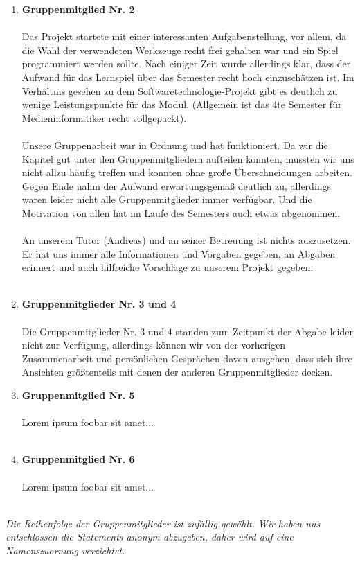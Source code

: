 \documentclass[a4paper]{article}
\begin{document}
\begin{enumerate}
    \item \textbf{Gruppenmitglied Nr. 2}\\
    \\
    Das Projekt startete mit einer interessanten Aufgabenstellung, vor allem, da die Wahl der verwendeten Werkzeuge recht frei gehalten war und ein Spiel programmiert werden sollte. Nach einiger Zeit wurde allerdings klar, dass der Aufwand für das Lernspiel über das Semester recht hoch einzuschätzen ist. Im Verhältnis gesehen zu dem Softwaretechnologie-Projekt gibt es deutlich zu wenige Leistungspunkte für das Modul. (Allgemein ist das 4te Semester für Medieninformatiker recht vollgepackt).\\
    \\
    Unsere Gruppenarbeit war in Ordnung und hat funktioniert. Da wir die Kapitel gut unter den Gruppenmitgliedern aufteilen konnten, mussten wir uns nicht allzu häufig treffen und konnten ohne große Überschneidungen arbeiten. Gegen Ende nahm der Aufwand erwartungsgemäß deutlich zu, allerdings waren leider nicht alle Gruppenmitglieder immer verfügbar. Und die Motivation von allen hat im Laufe des Semesters auch etwas abgenommen.\\
    \\
    An unserem Tutor (Andreas) und an seiner Betreuung ist nichts auszusetzen. Er hat uns immer alle Informationen und Vorgaben gegeben, an Abgaben erinnert und auch hilfreiche Vorschläge zu unserem Projekt gegeben.\\
    \\

    \item \textbf{Gruppenmitglieder Nr. 3 und 4}\\
    \\
    Die Gruppenmitglieder Nr. 3 und 4 standen zum Zeitpunkt der Abgabe leider nicht zur Verfügung, allerdings können wir von der vorherigen Zusammenarbeit und persönlichen Gesprächen davon ausgehen, dass sich ihre Ansichten größtenteils mit denen der anderen Gruppenmitglieder decken.
    \\

    \item \textbf{Gruppenmitglied Nr. 5}\\
    \\
    Lorem ipsum foobar sit amet...\\
    \\

    \item \textbf{Gruppenmitglied Nr. 6}\\
    \\
    Lorem ipsum foobar sit amet...\\
    \\

\end{enumerate}

\textit{Die Reihenfolge der Gruppenmitglieder ist zufällig gewählt.}
\textit{Wir haben uns entschlossen die Statements anonym abzugeben, daher wird auf eine Namenszuornung verzichtet.}

\end{document}
